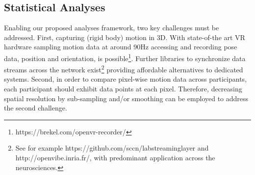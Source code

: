 \subsection{Statistical Analyses}
Enabling our proposed analyses framework, two key challenges must be addressed. First, capturing (rigid body) motion in 3D. With state-of-the art VR hardware sampling motion data at around 90Hz accessing and recording pose data, position and orientation, is possible\footnote{https://brekel.com/openvr-recorder/}. Further libraries to synchronize data streams across the network exist\footnote{See for example https://github.com/sccn/labstreaminglayer and http://openvibe.inria.fr/, with predominant application across the neurosciences.} providing affordable alternatives to dedicated systems. Second, in order to compare pixel-wise motion data across participants, each participant should exhibit data points at each pixel. Therefore, decreasing spatial resolution by sub-sampling and/or smoothing can be employed to address the second challenge.

